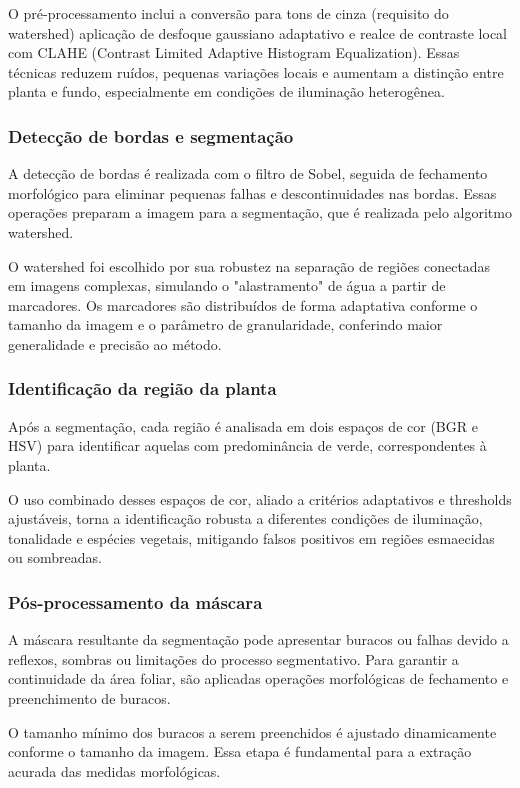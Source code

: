 O pré-processamento inclui a conversão para tons de cinza (requisito do watershed) aplicação de desfoque gaussiano adaptativo e realce de contraste local com CLAHE (Contrast Limited Adaptive Histogram Equalization). Essas técnicas reduzem ruídos, pequenas variações locais e aumentam a distinção entre planta e fundo, especialmente em condições de iluminação heterogênea.

\subsubsection{Detecção de bordas e segmentação}
A detecção de bordas é realizada com o filtro de Sobel, seguida de fechamento morfológico para eliminar pequenas falhas e descontinuidades nas bordas. Essas operações preparam a imagem para a segmentação, que é realizada pelo algoritmo watershed.

O watershed foi escolhido por sua robustez na separação de regiões conectadas em imagens complexas, simulando o "alastramento" de água a partir de marcadores. Os marcadores são distribuídos de forma adaptativa conforme o tamanho da imagem e o parâmetro de granularidade, conferindo maior generalidade e precisão ao método.

\subsubsection{Identificação da região da planta}
Após a segmentação, cada região é analisada em dois espaços de cor (BGR e HSV) para identificar aquelas com predominância de verde, correspondentes à planta.

O uso combinado desses espaços de cor, aliado a critérios adaptativos e thresholds ajustáveis, torna a identificação robusta a diferentes condições de iluminação, tonalidade e espécies vegetais, mitigando falsos positivos em regiões esmaecidas ou sombreadas.

\subsubsection{Pós-processamento da máscara}
A máscara resultante da segmentação pode apresentar buracos ou falhas devido a reflexos, sombras ou limitações do processo segmentativo. Para garantir a continuidade da área foliar, são aplicadas operações morfológicas de fechamento e preenchimento de buracos.

O tamanho mínimo dos buracos a serem preenchidos é ajustado dinamicamente conforme o tamanho da imagem. Essa etapa é fundamental para a extração acurada das medidas morfológicas.

